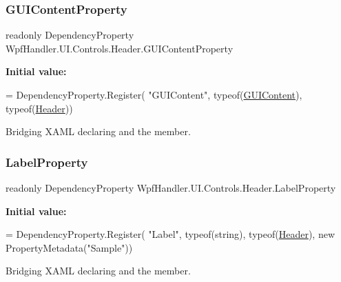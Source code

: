 \subsubsection{\texorpdfstring{G\+U\+I\+Content\+Property}{GUIContentProperty}}
{\footnotesize\ttfamily readonly Dependency\+Property Wpf\+Handler.\+U\+I.\+Controls.\+Header.\+G\+U\+I\+Content\+Property\hspace{0.3cm}{\ttfamily [static]}}

{\bfseries Initial value\+:}
\begin{DoxyCode}
= DependencyProperty.Register(
            \textcolor{stringliteral}{"GUIContent"}, typeof(\mbox{\hyperlink{class_wpf_handler_1_1_u_i_1_1_controls_1_1_header_a0039e7d4594591d0d9ca1bf99a1ee497}{GUIContent}}), typeof(\mbox{\hyperlink{class_wpf_handler_1_1_u_i_1_1_controls_1_1_header_a58551b76c66c4da201070cf01d0561f6}{Header}}))
\end{DoxyCode}


Bridging X\+A\+ML declaring and the member. 

\mbox{\label{class_wpf_handler_1_1_u_i_1_1_controls_1_1_header_a69d6de68c4cb8c83f31b15efbd0323dc}} 
\subsubsection{\texorpdfstring{Label\+Property}{LabelProperty}}
{\footnotesize\ttfamily readonly Dependency\+Property Wpf\+Handler.\+U\+I.\+Controls.\+Header.\+Label\+Property\hspace{0.3cm}{\ttfamily [static]}}

{\bfseries Initial value\+:}
\begin{DoxyCode}
= DependencyProperty.Register(
            \textcolor{stringliteral}{"Label"}, typeof(\textcolor{keywordtype}{string}), typeof(\mbox{\hyperlink{class_wpf_handler_1_1_u_i_1_1_controls_1_1_header_a58551b76c66c4da201070cf01d0561f6}{Header}}), \textcolor{keyword}{new} PropertyMetadata(\textcolor{stringliteral}{"Sample"}))
\end{DoxyCode}


Bridging X\+A\+ML declaring and the member. 



